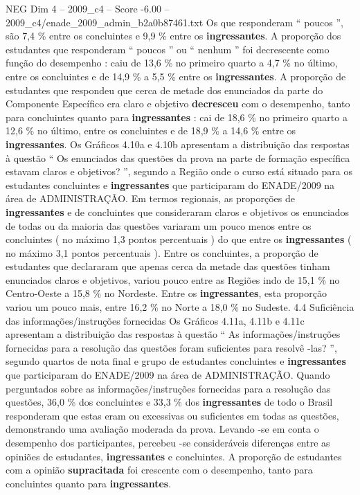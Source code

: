 \begin{textsample}{NEG Dim 4 – 2009\_c4 – Score -6.00 – 2009\_c4/enade\_2009\_admin\_b2a0b87461.txt}
Os que responderam “ poucos ”, são 7,4 \% entre os concluintes e 9,9 \% entre os \textbf{ingressantes}.
A proporção dos estudantes que responderam “ poucos ” ou “ nenhum ” foi decrescente como função do desempenho : caiu de 13,6 \% no primeiro quarto a 4,7 \% no último, entre os concluintes e de 14,9 \% a 5,5 \% entre os \textbf{ingressantes}.
A proporção de estudantes que respondeu que cerca de metade dos enunciados da parte do Componente Específico era claro e objetivo \textbf{decresceu} com o desempenho, tanto para concluintes quanto para \textbf{ingressantes} : cai de 18,6 \% no primeiro quarto a 12,6 \% no último, entre os concluintes e de 18,9 \% a 14,6 \% entre os \textbf{ingressantes}.
Os Gráficos 4.10a e 4.10b apresentam a distribuição das respostas à questão “ Os enunciados das questões da prova na parte de formação específica estavam claros e objetivos? ”, segundo a Região onde o curso está situado para os estudantes concluintes e \textbf{ingressantes} que participaram do ENADE/2009 na área de ADMINISTRAÇÃO.
Em termos regionais, as proporções de \textbf{ingressantes} e de concluintes que consideraram claros e objetivos os enunciados de todas ou da maioria das questões variaram um pouco menos entre os concluintes ( no máximo 1,3 pontos percentuais ) do que entre os \textbf{ingressantes} ( no máximo 3,1 pontos percentuais ).
Entre os concluintes, a proporção de estudantes que declararam que apenas cerca da metade das questões tinham enunciados claros e objetivos, variou pouco entre as Regiões indo de 15,1 \% no Centro-Oeste a 15,8 \% no Nordeste.
Entre os \textbf{ingressantes}, esta proporção variou um pouco mais, entre 16,2 \% no Norte a 18,0 \% no Sudeste. 4.4 Suficiência das informações/instruções fornecidas Os Gráficos 4.11a, 4.11b e 4.11c apresentam a distribuição das respostas à questão “ As informações/instruções fornecidas para a resolução das questões foram suficientes para resolvê -las? ”, segundo quartos de nota final e grupo de estudantes concluintes e \textbf{ingressantes} que participaram do ENADE/2009 na área de ADMINISTRAÇÃO.
Quando perguntados sobre as informações/instruções fornecidas para a resolução das questões, 36,0 \% dos concluintes e 33,3 \% dos \textbf{ingressantes} de todo o Brasil responderam que estas eram ou excessivas ou suficientes em todas as questões, demonstrando uma avaliação moderada da prova.
Levando -se em conta o desempenho dos participantes, percebeu -se consideráveis diferenças entre as opiniões de estudantes, \textbf{ingressantes} e concluintes.
A proporção de estudantes com a opinião \textbf{supracitada} foi crescente com o desempenho, tanto para concluintes quanto para \textbf{ingressantes}.

\end{textsample}
